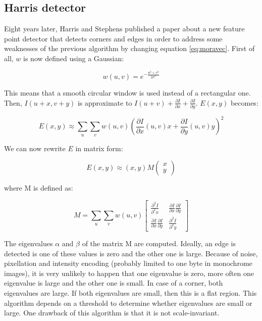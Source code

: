 \documentclass[11pt]{report}
\begin{document}
\subsection{Harris detector}
Eight years later, Harris and Stephens published a paper\cite{Harris88} about a new feature point detector that detects corners and edges in order to address some weaknesses of the previous algorithm by changing  equation \ref{eq:moravec}. First of all, $w$ is now defined using a Gaussian:

\[
  w(u, v) = e^{-\frac{u^2+v^2}{2\sigma^2}}
\]

This means that a smooth circular window is used instead of a rectangular one.
Then, $I(u+x, v+y)$ is approximate to $I(u+v) + \frac{\partial I}{\partial x} + \frac{\partial I}{\partial y}$. $E(x, y)$ becomes:

\[
E(x, y) \approx \sum_u \sum_v w(u, v) \left ( \frac{\partial I}{\partial x}(u, v)x + \frac{\partial I}{\partial y}(u, v)y \right ) ^2
\]

We can now rewrite $E$ in matrix form:

\[
E(x,y) \approx (x,y) M  \begin{pmatrix}x\\y\end{pmatrix}
\]

where M is defined as:

\[
  M =  \sum_u \sum_v w(u, v) \left [ \begin{matrix} \frac{\partial^2 I}{\partial^2 x} & \frac{\partial I}{\partial x} \frac{\partial I}{\partial y} \\ \frac{\partial I}{\partial x} \frac{\partial I}{\partial y} & \frac{\partial^2 I}{\partial^2 y} \end{matrix} \right ]
\]

The eigenvalues $\alpha$ and $\beta$ of the matrix M are computed. Ideally, an edge is detected is one of these values is zero and the other one is large. Because of noise, pixellation and intensity encoding (probably limited to one byte in monochrome images), it is very unlikely to happen that one eigenvalue is zero, more often one eigenvalue is large and the other one is small. In case of a corner, both eigenvalues are large. If both eigenvalues are small, then this is a flat region. This algorithm depends on a threshold to determine whether eigenvalues are small or large. One drawback of this algorithm is that it is not scale-invariant.
\end{document}
